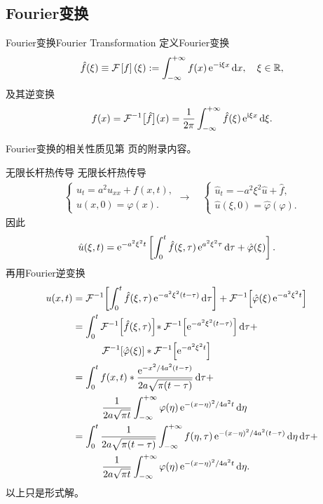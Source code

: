 \subsection{Fourier变换}
\setcounter{subsubsection}{1}
\begin{definition}{Fourier变换}{Fourier Transformation}
	定义Fourier变换
	\[
		\hat f(\xi)\equiv\mathcal F_\mathrm{\!\,}\left[f\right](\xi):=\int_{-\infty}^{+\infty} f(x)\mathop{}\!\mathrm{e}^{-\mathrm{i}\xi x}\mathop{}\!\mathrm{d} x,\quad \xi\in\mathbb R,
	\]
	及其逆变换
	\[
		f(x)=\mathcal F^{-1}\big[\hat f\big](x)=\frac1{2\pi}\int_{-\infty}^{+\infty}\hat f(\xi)\mathop{}\!\mathrm{e}^{\mathrm{i}\xi x}\mathop{}\!\mathrm{d}\xi.
	\]
\end{definition}
Fourier变换的相关性质见第 \pageref{The Property of Fourier Transformation} 页的附录内容。
\begin{example}{无限长杆热传导}{}
	无限长杆热传导
	\begin{align*}
		\begin{cases}
			u_t=a^2u_{xx}+f(x,t),\\
			u(x,0)=\varphi(x).
		\end{cases}\longrightarrow\quad\begin{cases}
			\hat u_t=-a^2\xi^2\hat u+\hat f,\\
			\hat u(\xi,0)=\hat\varphi(\varphi).
		\end{cases}
	\end{align*}
	因此
	\begin{align*}
		\hat u(\xi,t)&=\mathop{}\!\mathrm{e}^{-a^2\xi^2t}\left[\int_0^t\hat f(\xi,\tau)\mathop{}\!\mathrm{e}^{a^2\xi^2\tau}\mathop{}\!\mathrm{d}\tau+\hat\varphi(\xi)\right].
	\end{align*}
	再用Fourier逆变换
	\begin{align*}
		u(x,t)&=\cfi{\int_0^t\hat f(\xi,\tau)\e{-a^2\xi^2(t-\tau)}\d\tau}+\cfi{\hat\varphi(\xi)\e{-a^2\xi^2t}}\\
		&=\int_0^t\cfi{\hat f(\xi,\tau)}\!\ast\cfi{\e{-a^2\xi^2(t-\tau)}}\d\tau+\\
		&\qqquad\cfi{\hat\varphi(\xi)}\ast\cfi{\e{-a^2\xi^2t}}\\
		&=\int_0^tf(x,t)\ast\frac{\e{-x^2/4a^2(t-\tau)}}{2a\sqrt{\pi(t-\tau)}}\d\tau+\\
		&\qqquad\frac1{2a\sqrt{\pi t}}\int\iti\varphi(\eta)\e{-(x-\eta)^2/4a^2t}\d\eta\\
		&=\int_0^t\frac1{2a\sqrt{\pi(t-\tau)}}\int\iti f(\eta,\tau)\e{-(x-\eta)^2/4a^2(t-\tau)}\d\eta\d\tau+\\
		&\qqquad\frac1{2a\sqrt{\pi t}}\int\iti\varphi(\eta)\e{-(x-\eta)^2/4a^2t}\d\eta.
	\end{align*}
	以上只是形式解。
\end{example}
